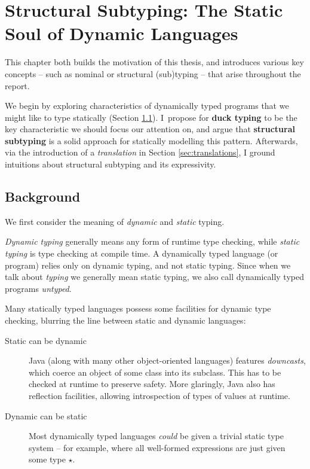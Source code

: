 \chapter
    [Structural Subtyping: The Static Soul of Dynamic Languages]
    {Structural Subtyping: \newline The Static Soul of Dynamic Languages}
\label{static-soul}

This chapter both builds the motivation of this thesis, and introduces various key concepts -- such as nominal or structural (sub)typing -- that arise throughout the report.

We begin by exploring characteristics of dynamically typed programs that we might like to type statically (Section \ref{sec:ch2background}). I~propose for \textbf{duck typing} to be the key characteristic we should focus our attention on, and argue that \textbf{structural subtyping} is a solid approach for statically modelling this pattern. Afterwards, via the introduction of a \emph{translation} in Section \ref{sec:translations}, I ground intuitions about structural subtyping and its expressivity.

\section{Background}
\label{sec:ch2background}

We first consider the meaning of \emph{dynamic} and \emph{static} typing.

\emph{Dynamic typing} generally means any form of runtime type checking, while \emph{static typing} is type checking at compile time. A dynamically typed language (or program) relies only on dynamic typing, and not static typing. Since when we talk about \emph{typing} we generally mean static typing, we also call dynamically typed programs \emph{untyped}.

Many statically typed languages possess some facilities for dynamic type checking, blurring the line between static and dynamic languages: \begin{description}
    \item[Static can be dynamic] Java (along with many other object-oriented languages) features \textit{downcasts}, which coerce an object of some class into its subclass. This has to be checked at runtime to preserve safety. 
    More glaringly, Java also has reflection facilities, allowing introspection of types of values at runtime. 
    \item[Dynamic can be static] Most dynamically typed languages \emph{could} be given a trivial static type system -- for example, where all well-formed expressions are just given some type $\star$. 
\end{description} 

